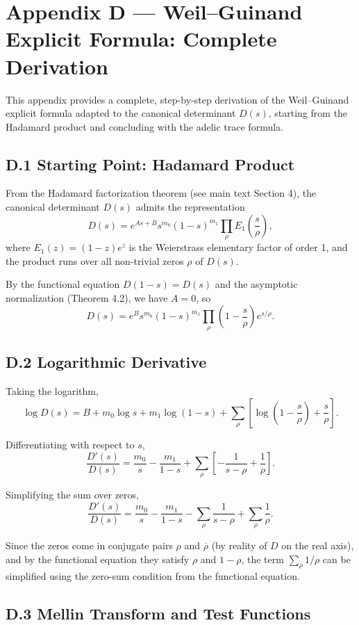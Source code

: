 \section*{Appendix D — Weil–Guinand Explicit Formula: Complete Derivation}

This appendix provides a complete, step-by-step derivation of the Weil–Guinand explicit formula adapted to the canonical determinant $D(s)$, starting from the Hadamard product and concluding with the adelic trace formula.

\subsection*{D.1 Starting Point: Hadamard Product}

From the Hadamard factorization theorem (see main text Section 4), the canonical determinant $D(s)$ admits the representation
\[
D(s) = e^{As + B} s^{m_0} (1-s)^{m_1} \prod_{\rho} E_1\left(\frac{s}{\rho}\right),
\]
where $E_1(z) = (1-z)e^z$ is the Weierstrass elementary factor of order 1, and the product runs over all non-trivial zeros $\rho$ of $D(s)$.

By the functional equation $D(1-s) = D(s)$ and the asymptotic normalization (Theorem 4.2), we have $A = 0$, so
\[
D(s) = e^B s^{m_0} (1-s)^{m_1} \prod_{\rho} \left(1 - \frac{s}{\rho}\right) e^{s/\rho}.
\]

\subsection*{D.2 Logarithmic Derivative}

Taking the logarithm,
\[
\log D(s) = B + m_0 \log s + m_1 \log(1-s) + \sum_{\rho} \left[\log\left(1 - \frac{s}{\rho}\right) + \frac{s}{\rho}\right].
\]

Differentiating with respect to $s$,
\[
\frac{D'(s)}{D(s)} = \frac{m_0}{s} - \frac{m_1}{1-s} + \sum_{\rho} \left[-\frac{1}{s - \rho} + \frac{1}{\rho}\right].
\]

Simplifying the sum over zeros,
\[
\frac{D'(s)}{D(s)} = \frac{m_0}{s} - \frac{m_1}{1-s} - \sum_{\rho} \frac{1}{s - \rho} + \sum_{\rho} \frac{1}{\rho}.
\]

Since the zeros come in conjugate pairs $\rho$ and $\overline{\rho}$ (by reality of $D$ on the real axis), and by the functional equation they satisfy $\rho$ and $1-\rho$, the term $\sum_\rho 1/\rho$ can be simplified using the zero-sum condition from the functional equation.

\subsection*{D.3 Mellin Transform and Test Functions}

